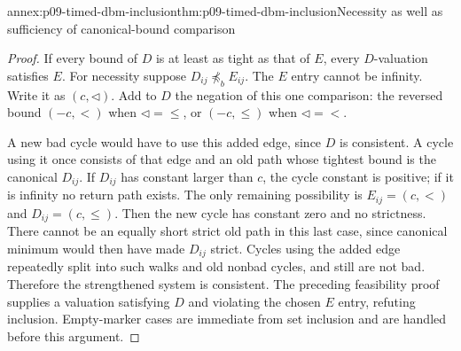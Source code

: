 \begin{annexitem}{annex:p09-timed-dbm-inclusion}{thm:p09-timed-dbm-inclusion}{Necessity as well as sufficiency of canonical-bound comparison}
\begin{proof}
If every bound of \(D\) is at least as tight as that of \(E\), every
\(D\)-valuation satisfies \(E\). For necessity suppose
\(D_{ij}\not\preceq_bE_{ij}\). The \(E\) entry cannot be infinity.
Write it as \((c,\triangleleft)\). Add to \(D\) the negation of this
one comparison: the reversed bound \((-c,<)\) when
\(\triangleleft=\leq\), or \((-c,\leq)\) when
\(\triangleleft=<\).

A new bad cycle would have to use this added edge, since \(D\) is
consistent. A cycle using it once consists of that edge and an old path
whose tightest bound is the canonical \(D_{ij}\). If \(D_{ij}\) has
constant larger than \(c\), the cycle constant is positive; if it is
infinity no return path exists. The only remaining possibility is
\(E_{ij}=(c,<)\) and \(D_{ij}=(c,\leq)\). Then the new cycle has
constant zero and no strictness. There cannot be an equally short strict
old path in this last case, since canonical minimum would then have
made \(D_{ij}\) strict. Cycles using the added edge repeatedly split
into such walks and old nonbad cycles, and still are not bad. Therefore
the strengthened system is consistent. The preceding feasibility proof
supplies a valuation satisfying \(D\) and violating the chosen \(E\)
entry, refuting inclusion. Empty-marker cases are immediate from set
inclusion and are handled before this argument.
\end{proof}
\end{annexitem}

